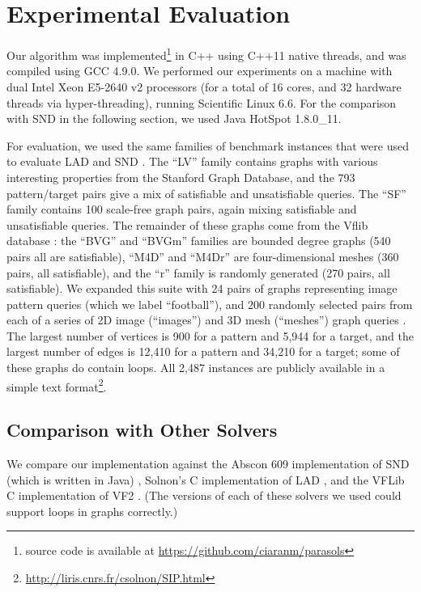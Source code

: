 \documentclass{llncs}
\begin{document}
\section{Experimental Evaluation}\label{section:experiments}

Our algorithm was implemented\footnote{source code is available at
\url{https://github.com/ciaranm/parasols}} in C++ using C++11 native threads, and was compiled using
GCC 4.9.0.  We performed our experiments on a machine with dual Intel Xeon E5-2640 v2 processors
(for a total of 16 cores, and 32 hardware threads via hyper-threading), running Scientific Linux
6.6.  For the comparison with SND in the following section, we used Java HotSpot 1.8.0\_11.

For evaluation, we used the same families of benchmark instances that were used to evaluate LAD
\cite{Solnon:2010} and SND \cite{Audemard:2014}. The ``LV'' family \cite{Larrosa:2002} contains
graphs with various interesting properties from the Stanford Graph Database, and the 793
pattern/target pairs give a mix of satisfiable and unsatisfiable queries. The ``SF'' family contains
100 scale-free graph pairs, again mixing satisfiable and unsatisfiable queries. The remainder of
these graphs come from the Vflib database \cite{Cordella:2004}: the ``BVG'' and ``BVGm'' families
are bounded degree graphs (540 pairs all are satisfiable), ``M4D'' and ``M4Dr'' are four-dimensional
meshes (360 pairs, all satisfiable), and the ``r'' family is randomly generated (270 pairs, all
satisfiable).  We expanded this suite with 24 pairs of graphs representing image pattern queries
\cite{Damiand:2011} (which we label ``football''), and 200 randomly selected pairs from each of a
series of 2D image (``images'') and 3D mesh (``meshes'') graph queries \cite{Solnon:2015}. The
largest number of vertices is 900 for a pattern and 5,944 for a target, and the largest number of
edges is 12,410 for a pattern and 34,210 for a target; some of these graphs do contain loops. All
2,487 instances are publicly available in a simple text
format\footnote{\url{http://liris.cnrs.fr/csolnon/SIP.html}}.

\subsection{Comparison with Other Solvers}

We compare our implementation against the Abscon 609 implementation of SND (which is written in
Java) \cite{Audemard:2014}, Solnon's C implementation of LAD \cite{Solnon:2010}, and the VFLib C
implementation of VF2 \cite{Cordella:2004}. (The versions of each of these solvers we used could
support loops in graphs correctly.)
\end{document}

